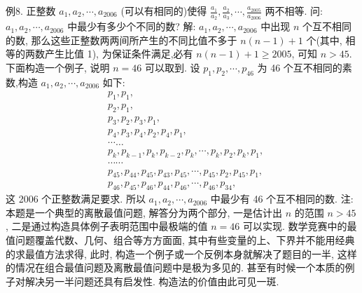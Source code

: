 例8. 正整数 $a_1, a_2, \cdots, a_{2006}$ (可以有相同的)使得 $\frac{a_1}{a_2}, \frac{a_2}{a_3}, \cdots, \frac{a_{2005}}{a_{2006}}$ 两不相等.
问: $a_1, a_2, \cdots, a_{2006}$ 中最少有多少个不同的数? 
解: $a_1, a_2, \cdots, a_{2006}$ 中出现 $n$ 个互不相同的数, 那么这些正整数两两间所产生的不同比值不多于 $n(n-1)+1$ 个(其中, 相等的两数产生比值 1), 为保证条件满足,必有 $n(n-1)+1 \geqslant 2005$, 可知 $n>45$.
下面构造一个例子, 说明 $n=46$ 可以取到.
设 $p_1, p_2, \cdots, p_{46}$ 为 46 个互不相同的素数,构造 $a_1, a_2, \cdots, a_{2006}$ 如下:
$$
\begin{aligned}
& p_1, p_1, \\
& p_2, p_1, \\
& p_3, p_2, p_3, p_1, \\
& p_4, p_3, p_4, p_2, p_4, p_1, \\
& \cdots \ldots \\
& p_k, p_{k-1}, p_k, p_{k-2}, p_k, \cdots, p_k, p_2, p_k, p_1, \\
& \cdots \cdots \\
& p_{45}, p_{44}, p_{45}, p_{43}, p_{45}, \cdots, p_{45}, p_2, p_{45}, p_1, \\
& p_{46}, p_{45}, p_{46}, p_{44}, p_{46}, \cdots, p_{46}, p_{34},
\end{aligned}
$$
这 2006 个正整数满足要求.
所以 $a_1, a_2, \cdots, a_{2006}$ 中最少有 46 个互不相同的数.
注:本题是一个典型的离散最值问题, 解答分为两个部分, 一是估计出 $n$ 的范围 $n>45$, 二是通过构造具体例子表明范围中最极端的值 $n=46$ 可以实现.
数学竞赛中的最值问题覆盖代数、几何、组合等方方面面, 其中有些变量的上、下界并不能用经典的求最值方法求得, 此时, 构造一个例子或一个反例本身就解决了题目的一半, 这样的情况在组合最值问题及离散最值问题中是极为多见的.
甚至有时候一个本质的例子对解决另一半问题还具有启发性.
构造法的价值由此可见一斑.



